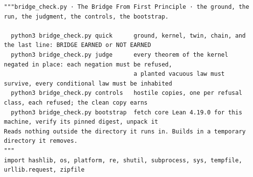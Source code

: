 \documentclass[10pt,twocolumn]{article}
\begin{document}
\begin{Verbatim}
"""bridge_check.py · The Bridge From First Principle · the ground, the run, the judgment, the controls, the bootstrap.

  python3 bridge_check.py quick      ground, kernel, twin, chain, and the last line: BRIDGE EARNED or NOT EARNED
  python3 bridge_check.py judge      every theorem of the kernel negated in place: each negation must be refused,
                                     a planted vacuous law must survive, every conditional law must be inhabited
  python3 bridge_check.py controls   hostile copies, one per refusal class, each refused; the clean copy earns
  python3 bridge_check.py bootstrap  fetch core Lean 4.19.0 for this machine, verify its pinned digest, unpack it
Reads nothing outside the directory it runs in. Builds in a temporary directory it removes.
"""
import hashlib, os, platform, re, shutil, subprocess, sys, tempfile, urllib.request, zipfile


\end{Verbatim}
\end{document}
